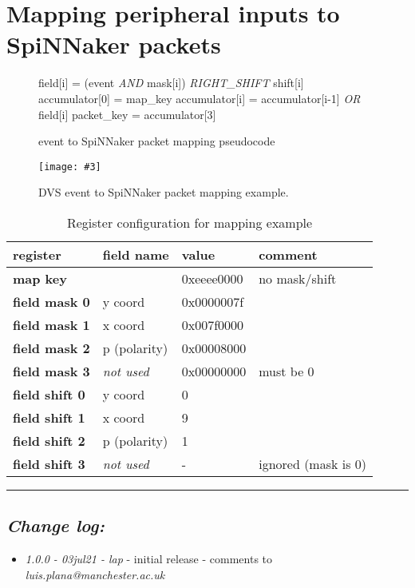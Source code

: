 \documentclass[11pt,a4paper,twoside]{article}
\newcommand{\image}[5][]
{
\begin{figure}[#2]
   \begin{center}
      \texttt{[image: \#3]}
      \caption{#5}
      \label{fig:#4}
   \end{center}
\end{figure}
}
\begin{document}
\section{Mapping peripheral inputs to SpiNNaker packets}


\begin{figure}[!ht]
	\centering
	\begin{minipage}{0.70\columnwidth}
		\begin{algorithm}[H]
			\caption{event to SpiNNaker packet mapping pseudocode}
			\begin{algorithmic}[1]
				\State field[i] = (event \textit{AND} mask[i]) \textit{RIGHT\_SHIFT} shift[i]
				\EndFor
				\State accumulator[0] = map\_key
				\State accumulator[i] = accumulator[i-1] \textit{OR} field[i]
				\EndFor
				\State packet\_key = accumulator[3]
			\end{algorithmic}
			\label{alg:crd+cfc_fifo}
		\end{algorithm}
	\end{minipage}
\end{figure}


\image[width = 0.9 \textwidth]{!h}{mapper_ex}{fig:maper_fig}
{DVS event to SpiNNaker packet mapping example.}


\begin{table}[!ht]
	\caption{Register configuration for mapping example}
	\begin{center}
		\begin{tabular}{| l l l l |}
			\hline
			\textbf{register}      & \textbf{field name} & \textbf{value} & \textbf{comment} \\%
			\hline
			\hline
			\textbf{map key}       &                   & 0xeeee0000 & no mask/shift  \\%
			\textbf{field mask 0}  & y coord           & 0x0000007f &                \\%
			\textbf{field mask 1}  & x coord           & 0x007f0000 &                \\%
			\textbf{field mask 2}  & p (polarity)      & 0x00008000 &                \\%
			\textbf{field mask 3}  & \textit{not used} & 0x00000000 & must be 0      \\%
			\textbf{field shift 0} & y coord           & 0          &                \\%
			\textbf{field shift 1} & x coord           & 9          &                \\%
			\textbf{field shift 2} & p (polarity)      & 1          &                \\%
			\textbf{field shift 3} & \textit{not used} & -          & ignored (mask is 0) \\%
			\hline
		\end{tabular}
	\end{center}
	\label{tab:map_regs}
\end{table}


\vspace*{1.0cm}
\rule{\linewidth}{2pt}


\subsection*{\itshape Change log:}


\begin{itemize}
	\item {\itshape 1.0.0 - 03jul21 - lap} - initial release - comments to
	{\itshape luis.plana@manchester.ac.uk}
\end{itemize}
\end{document}
